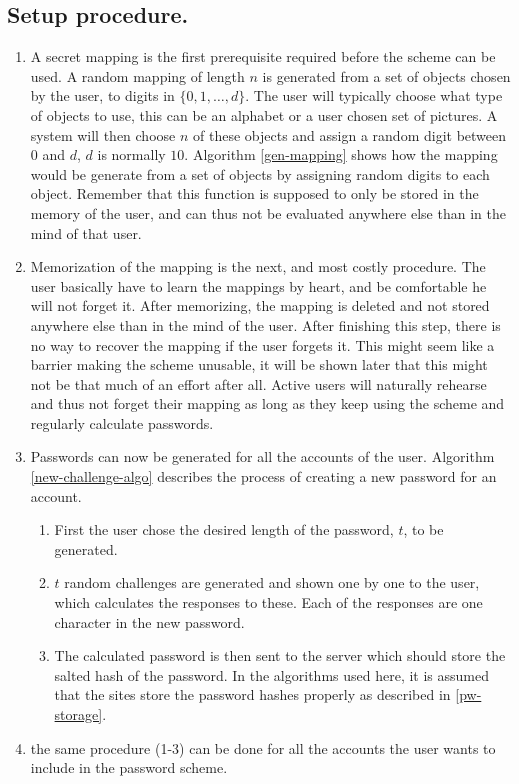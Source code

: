 \subsection{Setup procedure.}
\begin{enumerate}
    \item A secret mapping is the first prerequisite required before the scheme can be used. A random mapping of length $n$ is generated from a set of objects chosen by the user, to digits in $\{0,1,\dots,d\}$. The user will typically choose what type of objects to use, this can be an alphabet or a user chosen set of pictures. A system will then choose $n$ of these objects and assign a random digit between $0$ and $d$, $d$ is normally $10$. Algorithm \ref{gen-mapping} shows how the mapping would be generate from a set of objects by assigning random digits to each object. Remember that this function is supposed to only be stored in the memory of the user, and can thus not be evaluated anywhere else than in the mind of that user.
    \item Memorization of the mapping is the next, and most costly procedure. The user basically have to learn the mappings by heart, and be comfortable he will not forget it. After memorizing, the mapping is deleted and not stored anywhere else than in the mind of the user. After finishing this step, there is no way to recover the mapping if the user forgets it. This might seem like a barrier making the scheme unusable, it will be shown later that this might not be that much of an effort after all. Active users will naturally rehearse and thus not forget their mapping as long as they keep using the scheme and regularly calculate passwords.
    \item Passwords can now be generated for all the accounts of the user. Algorithm \ref{new-challenge-algo} describes the process of creating a new password for an account. 
    \begin{enumerate}
        \item First the user chose the desired length of the password, $t$, to be generated. 
        \item $t$ random challenges are generated and shown one by one to the user, which calculates the responses to these. Each of the responses are one character in the new password. 
        \item The calculated password is then sent to the server which should store the salted hash of the password. In the algorithms used here, it is assumed that the sites store the password hashes properly as described in \autoref{pw-storage}. 
    \end{enumerate}
    \item the same procedure (1-3) can be done for all the accounts the user wants to include in the password scheme.
\end{enumerate}

